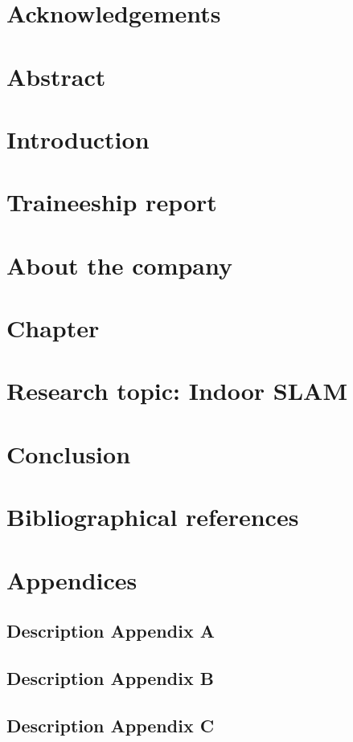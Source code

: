 \documentclass[12pt,a4paper]{report}
\newcommand\blankpage{\null\thispagestyle{empty}\newpage}
\begin{document}
  

  \blankpage

  

  \chapter*{Acknowledgements}

  \chapter*{Abstract}

  \tableofcontents

  \listoffigures

  \listoftables
  \printglossary[title={List of Abbreviations}]

  \chapter{Introduction} 

  \chapter{Traineeship report}

  \chapter{About the company}

  \chapter{Chapter}

  \chapter{Research topic: Indoor \gls{SLAM}}
  

  \chapter*{Conclusion}

  \chapter*{Bibliographical references}

  \chapter{Appendices}
    \section{Description Appendix A}
    \section{Description Appendix B}
    \section{Description Appendix C}
\end{document}
